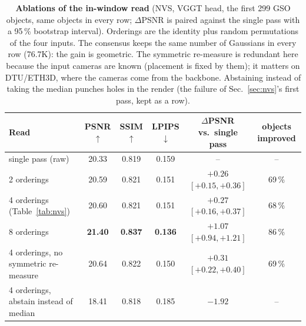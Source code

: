 \begin{table}[t]
\centering\scriptsize\setlength{\tabcolsep}{5pt}
\caption{\textbf{Ablations of the in-window read} (NVS, VGGT head, the first 299 GSO objects, same objects in every row;
$\Delta$PSNR is paired against the single pass with a 95\,\% bootstrap interval). Orderings are the identity plus random
permutations of the four inputs. The consensus keeps the same number of Gaussians in every row (76.7K): the gain is
geometric. The symmetric re-measure is redundant here because the input cameras are known (placement is fixed by them);
it matters on DTU/ETH3D, where the cameras come from the backbone. Abstaining instead of taking the median punches holes
in the render (the failure of Sec.~\ref{sec:nvs}'s first pass, kept as a row).}
\label{tab:ablation-read}
\begin{tabular}{@{}l ccc c c@{}}
\toprule
Read & PSNR$\uparrow$ & SSIM$\uparrow$ & LPIPS$\downarrow$ & $\Delta$PSNR vs.\ single pass & objects improved \\
\midrule
single pass (raw) & 20.33 & 0.819 & 0.159 & -- & -- \\
2 orderings & 20.59 & 0.821 & 0.151 & ${+}0.26$ $[{+}0.15,{+}0.36]$ & 69\,\% \\
4 orderings (Table~\ref{tab:nvs}) & 20.60 & 0.821 & 0.151 & ${+}0.27$ $[{+}0.16,{+}0.37]$ & 68\,\% \\
8 orderings & \textbf{21.40} & \textbf{0.837} & \textbf{0.136} & $\mathbf{{+}1.07}$ $[{+}0.94,{+}1.21]$ & 86\,\% \\
4 orderings, no symmetric re-measure & 20.64 & 0.822 & 0.150 & ${+}0.31$ $[{+}0.22,{+}0.40]$ & 69\,\% \\
4 orderings, abstain instead of median & 18.41 & 0.818 & 0.185 & $-1.92$ & -- \\
\bottomrule
\end{tabular}
\end{table}
